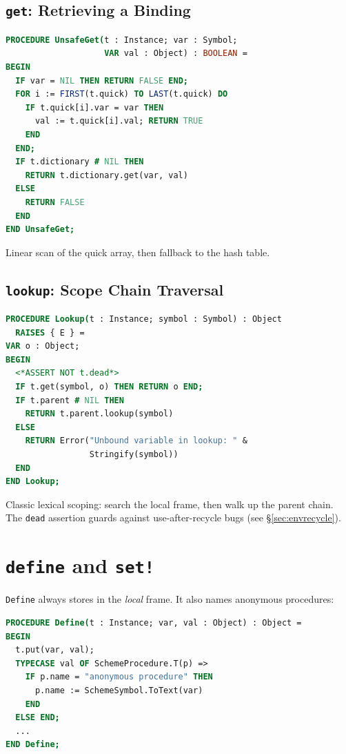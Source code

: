 \documentclass[12pt]{report}
\begin{document}
\subsection{\texttt{get}: Retrieving a Binding}

\begin{lstlisting}[language=Modula3]
PROCEDURE UnsafeGet(t : Instance; var : Symbol;
                    VAR val : Object) : BOOLEAN =
BEGIN
  IF var = NIL THEN RETURN FALSE END;
  FOR i := FIRST(t.quick) TO LAST(t.quick) DO
    IF t.quick[i].var = var THEN
      val := t.quick[i].val; RETURN TRUE
    END
  END;
  IF t.dictionary # NIL THEN
    RETURN t.dictionary.get(var, val)
  ELSE
    RETURN FALSE
  END
END UnsafeGet;
\end{lstlisting}

Linear scan of the quick array, then fallback to the hash table.

\subsection{\texttt{lookup}: Scope Chain Traversal}

\begin{lstlisting}[language=Modula3]
PROCEDURE Lookup(t : Instance; symbol : Symbol) : Object
  RAISES { E } =
VAR o : Object;
BEGIN
  <*ASSERT NOT t.dead*>
  IF t.get(symbol, o) THEN RETURN o END;
  IF t.parent # NIL THEN
    RETURN t.parent.lookup(symbol)
  ELSE
    RETURN Error("Unbound variable in lookup: " &
                 Stringify(symbol))
  END
END Lookup;
\end{lstlisting}

Classic lexical scoping: search the local frame, then walk up the
parent chain.  The \texttt{dead} assertion guards against use-after-recycle
bugs (see \S\ref{sec:envrecycle}).

\section{\texttt{define} and \texttt{set!}}

\texttt{Define} always stores in the \emph{local} frame.  It also
names anonymous procedures:

\begin{lstlisting}[language=Modula3]
PROCEDURE Define(t : Instance; var, val : Object) : Object =
BEGIN
  t.put(var, val);
  TYPECASE val OF SchemeProcedure.T(p) =>
    IF p.name = "anonymous procedure" THEN
      p.name := SchemeSymbol.ToText(var)
    END
  ELSE END;
  ...
END Define;
\end{lstlisting}
\end{document}
